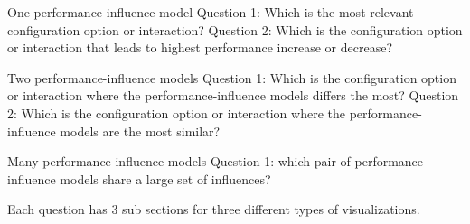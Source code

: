 One performance-influence model
Question 1: Which is the most relevant configuration option or interaction?
Question 2: Which is the configuration option or interaction that leads to highest performance increase or decrease?

Two performance-influence models
Question 1: Which is the configuration option or interaction where the performance-influence models differs the most?
Question 2: Which is the configuration option or interaction where the performance-influence models are the most similar?

Many performance-influence models
Question 1: which pair of performance-influence models share a large set of influences?

Each question has 3 sub sections for three different types of visualizations.
 